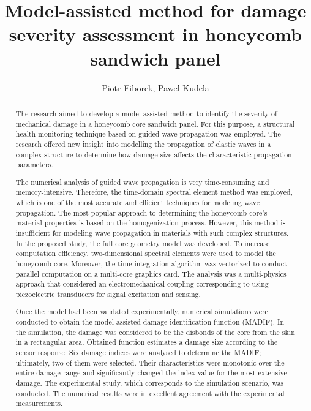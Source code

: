 \documentclass{article}
\title{Model-assisted method for damage severity assessment in honeycomb sandwich panel}
\author{Piotr Fiborek, Pawel Kudela}
\begin{document}
\maketitle
%
\begin{abstract}
The research aimed to develop a model-assisted method to identify the severity of mechanical damage in a honeycomb core sandwich panel. For this purpose, a structural health monitoring technique based on guided wave propagation was employed. The research offered new insight into modelling the propagation of elastic waves in a complex structure to determine how damage size affects the characteristic propagation parameters.	

The numerical analysis of guided wave propagation is very time-consuming and memory-intensive. Therefore, the time-domain spectral element method was employed, which is one of the most accurate and efficient techniques for modeling wave propagation. The most popular approach to determining the honeycomb core's material properties is based on the homogenization process. However, this method is insufficient for modeling wave propagation in materials with such complex structures. In the proposed study, the full core geometry model was developed. To increase computation efficiency, two-dimensional spectral elements were used to model the honeycomb core. Moreover, the time integration algorithm was vectorized to conduct parallel computation on a multi-core graphics card. The analysis was a multi-physics approach that considered an electromechanical coupling corresponding to using piezoelectric transducers for signal excitation and sensing.

Once the model had been validated experimentally, numerical simulations were conducted to obtain the model-assisted damage identification function (MADIF). In the simulation, the damage was considered to be the disbonds of the core from the skin in a rectangular area. Obtained function estimates a damage size according to the sensor response. Six damage indices were analysed to determine the MADIF; ultimately, two of them were selected. Their characteristics were monotonic over the entire damage range and significantly changed the index value for the most extensive damage. 
The experimental study, which corresponds to the simulation scenario, was conducted. The numerical results were in excellent agreement with the experimental measurements.

\end{abstract}
\end{document}
